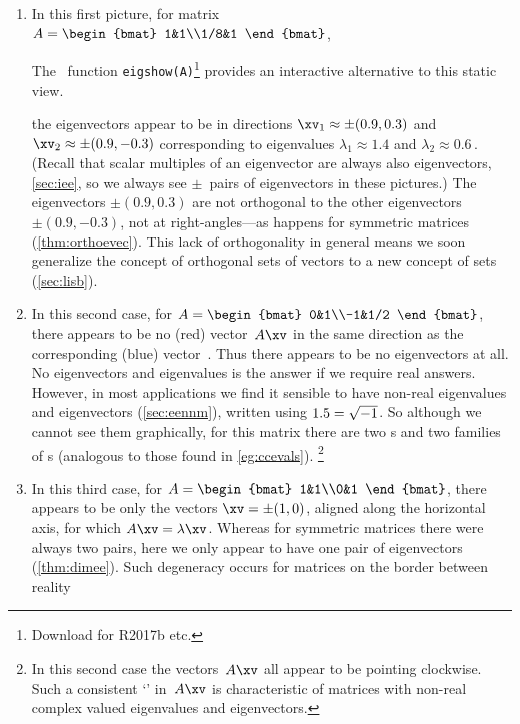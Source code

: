 \begin{enumerate}
\item 
In this first picture, for matrix
\( A=\begin{bmat} 1&1\\1/8&1 \end{bmat}\),
%
\begin{aside}
The \script[1]\ function \texttt{eigshow(A)}\footnote{Download for R2017b etc.} provides an interactive alternative to this static view.
\end{aside}%
the eigenvectors appear to be in directions \(\xv_1\approx\pm(0.9,0.3)\) and \(\xv_2\approx\pm(0.9,-0.3)\) corresponding to eigenvalues \(\lambda_1\approx1.4\) and \(\lambda_2\approx 0.6\)\,.
(Recall that scalar multiples of an eigenvector are always also eigenvectors, \cref{sec:iee}, so we always see \(\pm\)~pairs of eigenvectors in these pictures.)
The eigenvectors \(\pm(0.9,0.3)\) are not orthogonal to the other 
eigenvectors \(\pm(0.9,-0.3)\), not at right-angles---as happens for symmetric matrices (\cref{thm:orthoevec}).
This lack of orthogonality in general means we soon generalize the concept of orthogonal sets of vectors to a new concept of  sets (\cref{sec:lisb}).

\item 
In this second case, for
\( A=\begin{bmat} 0&1\\-1&1/2 \end{bmat}\), %
there appears to be no (red) vector~\(A\xv\) in the same direction as the corresponding (blue) vector~\xv.
Thus there appears to be no eigenvectors at all.
No eigenvectors and eigenvalues is the answer if we require real answers.
However, in most applications we find it sensible to have non-real  eigenvalues and eigenvectors (\cref{sec:eennm}), written using \(1.5=\sqrt{-1}\).
So although we cannot see them graphically, for this matrix there are two s and two families of s (analogous to those found in \cref{eg:ccevals}).%
\footnote{In this second case the vectors~\(A\xv\) all appear to be pointing clockwise.  
Such a consistent `' in~\(A\xv\) is characteristic of matrices with non-real complex valued eigenvalues and eigenvectors.}

\item 
In this third case, for
\( A=\begin{bmat} 1&1\\0&1 \end{bmat}\),
%
there appears to be only the vectors \(\xv=\pm(1,0)\), aligned along the horizontal axis, for which \(A\xv=\lambda\xv\).
Whereas for symmetric matrices there were always two pairs, here we only appear to have one pair of eigenvectors (\cref{thm:dimee}).
Such degeneracy occurs for matrices on the border between reality 

\end{enumerate}


